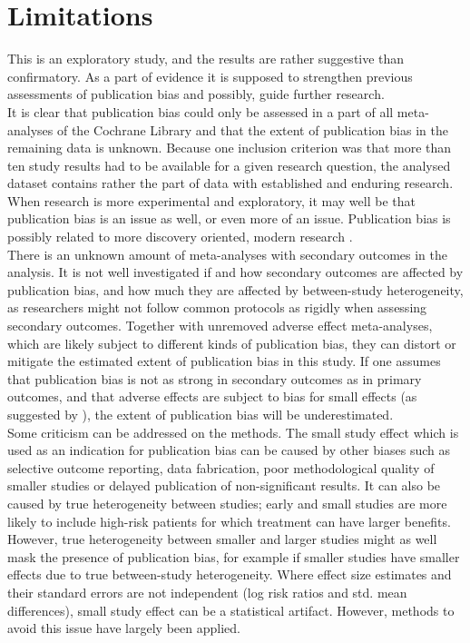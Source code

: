 \documentclass[11pt,a4paper,twoside]{book}\usepackage[]{graphicx}\usepackage[]{color}
\begin{document}
\section{Limitations}
This is an exploratory study, and the results are rather suggestive than confirmatory. As a part of evidence it is supposed to strengthen previous assessments of publication bias and possibly, guide further research. \\
It is clear that publication bias could only be assessed in a part of all meta-analyses of the Cochrane Library and that the extent of publication bias in the remaining data is unknown. Because one inclusion criterion was that more than ten study results had to be available for a given research question, the analysed dataset contains rather the part of data with established and enduring research. When research is more experimental and exploratory, it may well be that publication bias is an issue as well, or even more of an issue. Publication bias is possibly related to more discovery oriented, modern research \citep{ioannidis.2005}.\\
There is an unknown amount of meta-analyses with secondary outcomes in the analysis. It is not well investigated if and how secondary outcomes are affected by publication bias, and how much they are affected by between-study heterogeneity, as researchers might not follow common protocols as rigidly when assessing secondary outcomes. Together with unremoved adverse effect meta-analyses, which are likely subject to different kinds of publication bias, they can distort or mitigate the estimated extent of publication bias in this study. If one assumes that publication bias is not as strong in secondary outcomes as in primary outcomes, and that adverse effects are subject to bias for small effects (as suggested by \citealp{kicinsky}), the extent of publication bias will be underestimated.\\
Some criticism can be addressed on the methods. The small study effect which is used as an indication for publication bias can be caused by other biases such as selective outcome reporting, data fabrication, poor methodological quality of smaller studies or delayed publication of non-significant results. It can also be caused by true heterogeneity between studies; early and small studies are more likely to include high-risk patients for which treatment can have larger benefits. However, true heterogeneity between smaller and larger studies might as well mask the presence of publication bias, for example if smaller studies have smaller effects due to true between-study heterogeneity. Where effect size estimates and their standard errors are not independent (\eg log risk ratios and std. mean differences), small study effect can be a statistical artifact. However, methods to avoid this issue have largely been applied.\\
\end{document}
